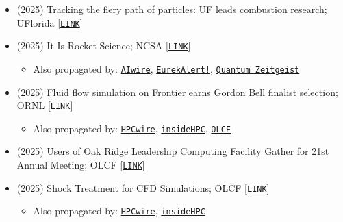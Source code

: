 \begin{itemize}
    \item (2025) Tracking the fiery path of particles: UF leads combustion research; UFlorida [\href{https://news.ufl.edu/2025/09/uf-combustion-research/}{\tt LINK}] 

    \item (2025) It Is Rocket Science; NCSA [\href{https://ncsa.illinois.edu/it-is-rocket-science/}{\tt LINK}]
    \begin{itemize}
        \item Also propagated by: \href{https://www.aiwire.net/2025/10/20/ncsa-led-team-simulates-200-trillion-point-rocket-engine-flow-on-deltaai/}{\tt AIwire}, \href{https://www.eurekalert.org/news-releases/1102251}{\tt EurekAlert!}, \href{https://quantumzeitgeist.com/georgia-tech-spacecraft-simulation-advancement/}{\tt Quantum Zeitgeist}
    \end{itemize}

    \item (2025) Fluid flow simulation on Frontier earns Gordon Bell finalist selection; ORNL [\href{https://www.ornl.gov/news/fluid-flow-simulation-frontier-earns-gordon-bell-finalist-selection}{\tt LINK}]
    \begin{itemize}
        \item Also propagated by: \href{https://www.hpcwire.com/off-the-wire/fluid-flow-simulation-on-frontier-earns-gordon-bell-finalist-selection/}{\tt HPCwire}, \href{https://insidehpc.com/2025/10/frontier-exascale-cfd-methodology-gets-gordon-bell-nomination-for-georgia-tech-nyu-researchers/}{\tt insideHPC}, \href{https://www.olcf.ornl.gov/2025/09/30/new-cfd-methodology-supersizes-results/}{\tt OLCF}
    \end{itemize}

    \item (2025) Users of Oak Ridge Leadership Computing Facility Gather for 21st Annual Meeting; OLCF [\href{https://www.olcf.ornl.gov/2025/09/09/users-of-oak-ridge-leadership-computing-facility-gather-for-21st-annual-meeting/}{\tt LINK}]

    \item (2025) Shock Treatment for CFD Simulations; OLCF [\href{https://www.olcf.ornl.gov/2025/07/23/shock-treatment-for-cfd-simulations/}{\tt LINK}]
    \begin{itemize}
        \item Also propagated by: \href{https://www.hpcwire.com/off-the-wire/oak-ridge-and-georgia-tech-push-frontier-to-new-scale-for-cfd-research/}{\tt HPCwire}, \href{https://insidehpc.com/2025/07/oak-ridge-reports-largest-cfd-simulation-achieved-on-frontier/}{\tt insideHPC}
    \end{itemize}


\end{itemize}
